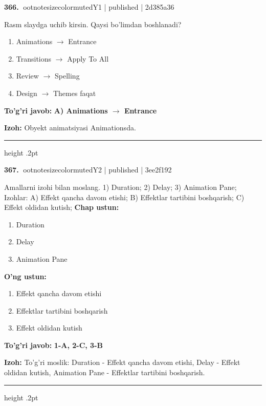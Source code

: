 \documentclass[10pt,a4paper]{article}
\begin{document}
\textbf{\color{ink}366.} {ootnotesizecolor{muted}Y1 | published | 2d385a36}
\par
Rasm slaydga uchib kirsin. Qaysi bo'limdan boshlanadi?
\begin{enumerate}[label=\Alph*),leftmargin=9mm]
\item Animations \ensuremath{\rightarrow} Entrance
\item Transitions \ensuremath{\rightarrow} Apply To All
\item Review \ensuremath{\rightarrow} Spelling
\item Design \ensuremath{\rightarrow} Themes faqat
\end{enumerate}
\begin{tcolorbox}[enhanced,breakable,colback=teal!4,colframe=teal!55!black,boxrule=0.45pt,arc=1.2mm,left=2.8mm,right=2.8mm,top=2mm,bottom=2mm]
\textbf{\color{teal}To'g'ri javob:} \textbf{A) Animations \ensuremath{\rightarrow} Entrance}
\par\smallskip
\textbf{Izoh:} Obyekt animatsiyasi Animationsda.
\end{tcolorbox}
\vspace{2mm}\hrule height .2pt\vspace{2mm}

\textbf{\color{ink}367.} {ootnotesizecolor{muted}Y2 | published | 3ee2f192}
\par
Amallarni izohi bilan moslang.  1) Duration;  2) Delay;  3) Animation Pane;  Izohlar: A) Effekt qancha davom etishi;  B) Effektlar tartibini boshqarish;  C) Effekt oldidan kutish;
\textbf{Chap ustun:}\begin{enumerate}[label=\arabic*),leftmargin=9mm]
\item Duration
\item Delay
\item Animation Pane
\end{enumerate}
\textbf{O'ng ustun:}\begin{enumerate}[label=\Alph*),leftmargin=9mm]
\item Effekt qancha davom etishi
\item Effektlar tartibini boshqarish
\item Effekt oldidan kutish
\end{enumerate}
\begin{tcolorbox}[enhanced,breakable,colback=teal!4,colframe=teal!55!black,boxrule=0.45pt,arc=1.2mm,left=2.8mm,right=2.8mm,top=2mm,bottom=2mm]
\textbf{\color{teal}To'g'ri javob:} \textbf{1-A, 2-C, 3-B}
\par\smallskip
\textbf{Izoh:} To'g'ri moslik: Duration - Effekt qancha davom etishi, Delay - Effekt oldidan kutish, Animation Pane - Effektlar tartibini boshqarish.
\end{tcolorbox}
\vspace{2mm}\hrule height .2pt\vspace{2mm}
\end{document}
